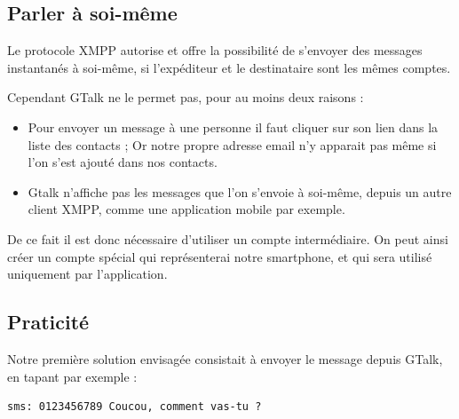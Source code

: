 
\subsection{Parler à soi-même}

Le protocole XMPP autorise et offre la possibilité de s'envoyer des messages instantanés à soi-même, si l'expéditeur et le destinataire sont les mêmes comptes.

Cependant GTalk ne le permet pas, pour au moins deux raisons :
\begin{itemize}
	\item Pour envoyer un message à une personne il faut cliquer sur son lien dans la liste des contacts ;
	Or notre propre adresse email n'y apparait pas même si l'on s'est ajouté dans nos contacts.
	\item Gtalk n'affiche pas les messages que l'on s'envoie à soi-même, depuis un autre client XMPP, comme une application mobile par exemple.
\end{itemize}

De ce fait il est donc nécessaire d'utiliser un compte intermédiaire.
On peut ainsi créer un compte spécial qui représenterai notre smartphone, et qui sera utilisé uniquement par l'application.
\\




\subsection{Praticité}

Notre première solution envisagée consistait à envoyer le message depuis GTalk, en tapant par exemple :
\begin{lstlisting}
sms: 0123456789 Coucou, comment vas-tu ?
\end{lstlisting}
~~\\

